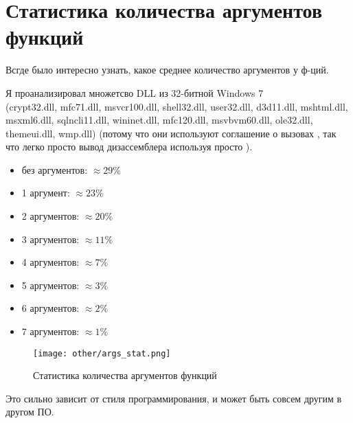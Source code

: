 \section{Статистика количества аргументов функций}
\label{args_stat}

Всгде было интересно узнать, какое среднее количество аргументов у ф-ций.

Я проанализировал множетсво DLL из 32-битной Windows 7 \\
(crypt32.dll, mfc71.dll, msvcr100.dll, shell32.dll, 
user32.dll, d3d11.dll, mshtml.dll, msxml6.dll, sqlncli11.dll, wininet.dll, mfc120.dll, msvbvm60.dll, ole32.dll, themeui.dll, wmp.dll) 
(потому что они используют соглашение о вызовах , так что легко просто  вывод дизассемблера используя
просто ).

\begin{itemize}
\item без аргументов: $\approx 29\%$
\item 1 аргумент: $\approx 23\%$
\item 2 аргументов: $\approx 20\%$
\item 3 аргументов: $\approx 11\%$
\item 4 аргументов: $\approx 7\%$
\item 5 аргументов: $\approx 3\%$
\item 6 аргументов: $\approx 2\%$
\item 7 аргументов: $\approx 1\%$
\end{itemize}

\begin{figure}[H]
\centering
\texttt{[image: other/args\_stat.png]}
\caption{Статистика количества аргументов функций}
\end{figure}

Это сильно зависит от стиля программирования, и может быть совсем другим в другом ПО.

